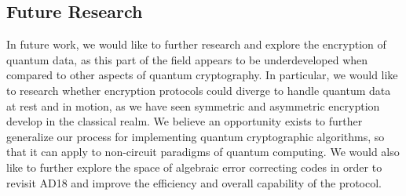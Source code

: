 \documentclass[sigconf]{acmart}
\begin{document}
\subsection{Future Research}
In future work, we would like to further research and explore the encryption of quantum data, as this part of the field appears to be underdeveloped when compared to other aspects of quantum cryptography. In particular, we would like to research whether encryption protocols could diverge to handle quantum data at rest and in motion, as we have seen symmetric and asymmetric encryption develop in the classical realm. We believe an opportunity exists to further generalize our process for implementing quantum cryptographic algorithms, so that it can apply to non-circuit paradigms of quantum computing. We would also like to further explore the space of algebraic error correcting codes in order to revisit AD18 and improve the efficiency and overall capability of the protocol. %

{}

\end{document}
